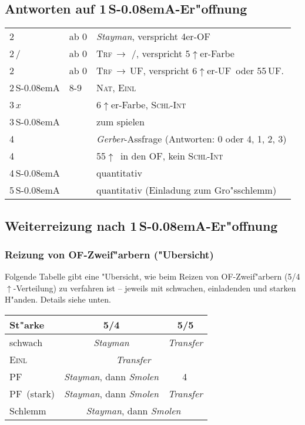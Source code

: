 \documentclass[11pt,german,twocolumn]{scrartcl}
\def\pik{\nobreak\,\Sp}
\def\coe{\nobreak\,\He}
\def\kar{\nobreak\,\Di}
\def\tre{\nobreak\,\Cl}
\def\pi{\Sp}
\def\co{\He}
\def\ra{$\rightarrow$}
\def\pl{$\uparrow$}
\def\uf{\nobreak\textsf{\,UF}}
\def\ufa{\nobreak\textsf{UF}}
\def\ofa{\nobreak\textsf{OF}}
\def\sa{\nobreak\textsf{S\kern-0.08emA}}
\def\SA{\nobreak\,\sa}
\newcommand{\conv}[1]{\emph{#1}}
\def\nat{\textsc{Nat}}
\def\pf{\textsc{PF}}
\def\inv{\textsc{Einl}}
\def\xfer{\textsc{Trf}}
\def\xferto{\xfer\,\ra\,}
\def\slamint{\textsc{Schl-Int}}
\newcommand\bidins[1]%
{%
\begin{flushleft}
\begin{tabularx}{\columnwidth}{llX}%
#1
\end{tabularx}%
\end{flushleft}
}
\newcommand{\Index}[1]{#1\index{#1}}
\begin{document}
\subsection{Antworten auf 1\SA-Er"offnung}
\bidins{%
2\tre & ab 0 & \conv{Stayman}, verspricht 4er-\ofa\\
2\kar/\co & ab 0 & \xferto\coe/\pi, verspricht
5\pl{}er-Farbe\\
2\pik & ab 0 & \xferto\ufa, verspricht 6\pl{}er-\ufa\ oder
55\uf.\\
2\SA & 8-9 & \nat, \inv\\
3\,$x$ && 6\pl{}er-Farbe, \slamint{}\\
3\SA && zum spielen\\
4\tre && \conv{\Index{Gerber}}-Assfrage (Antworten: 0 oder 4, 1, 2, 3)\\
4\kar && 55\pl\ in den \ofa, kein \slamint{}\\
4\SA && quantitativ\\
5\SA && quantitativ (Einladung zum Gro"sschlemm)
}

\subsection{Weiterreizung nach 1\SA-Er"offnung}

\subsubsection{Reizung von \ofa-Zweif"arbern ("Ubersicht)}

Folgende Tabelle gibt eine "Ubersicht, wie beim Reizen von
\ofa-Zweif"arbern (5/4\pl-Verteilung) zu verfahren ist -- jeweils mit
schwachen, einladenden und starken H"anden.  Details siehe unten.

\begin{tabular}[t]{|l|c|c|}
\hline
\textbf{St"arke} & \textbf{5/4} & \textbf{5/5}\\
\hline
\hline
schwach & \conv{Stayman} & \conv{Transfer}\\
\hline
\inv & \multicolumn{2}{c|}{\conv{Transfer}}\\
\hline
\pf & \conv{Stayman}, dann \conv{Smolen} & 4\kar\\
\hline
\pf\ (stark) & \conv{Stayman}, dann \conv{Smolen} & \conv{Transfer}\\
\hline
Schlemm & \multicolumn{2}{c|}{\conv{Stayman}, dann \conv{Smolen}}\\
\hline
\end{tabular}
\end{document}
